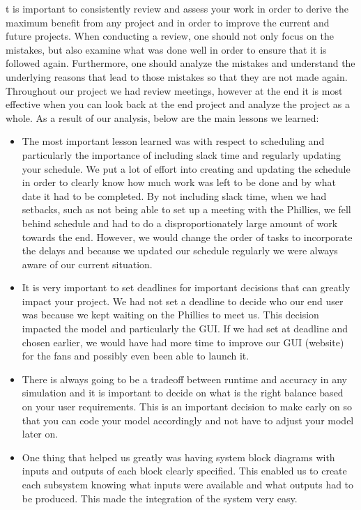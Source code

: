 t is important to consistently review and assess your work in order to derive the maximum benefit from any project and in order to improve the current and future projects. When conducting a review, one should not only focus on the mistakes, but also examine what was done well in order to ensure that it is followed again. Furthermore, one should analyze the mistakes and understand the underlying reasons that lead to those mistakes so that they are not made again. Throughout our project we had review meetings, however at the end it is most effective when you can look back at the end project and analyze the project as a whole. As a result of our analysis, below are the main lessons we learned:

\begin{itemize}
  \item The most important lesson learned was with respect to scheduling and particularly the importance of including slack time and regularly updating your schedule. We put a lot of effort into creating and updating the schedule in order to clearly know how much work was left to be done and by what date it had to be completed. By not including slack time, when we had setbacks, such as not being able to set up a meeting with the Phillies, we fell behind schedule and had to do a disproportionately large amount of work towards the end. However, we would change the order of tasks to incorporate the delays and because we updated our schedule regularly we were always aware of our current situation.

  \item It is very important to set deadlines for important decisions that can greatly impact your project. We had not set a deadline to decide who our end user was because we kept waiting on the Phillies to meet us. This decision impacted the model and particularly the GUI. If we had set at deadline and chosen earlier, we would have had more time to improve our GUI (website) for the fans and possibly even been able to launch it.

  \item There is always going to be a tradeoff between runtime and accuracy in any simulation and it is important to decide on what is the right balance based on your user requirements. This is an important decision to make early on so that you can code your model accordingly and not have to adjust your model later on.

  \item One thing that helped us greatly was having system block diagrams with inputs and outputs of each block clearly specified. This enabled us to create each subsystem knowing what inputs were available and what outputs had to be produced. This made the integration of the system very easy.


\end{itemize}
